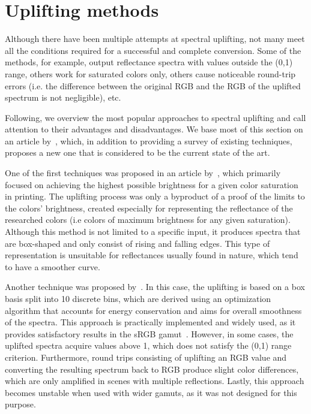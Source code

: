 \section{Uplifting methods} \label{sec:upliftingMethods}

Although there have been multiple attempts at spectral uplifting, not many meet all the conditions required for a successful and complete conversion. Some of the methods, for example, output reflectance spectra with values outside the (0,1) range, others work for saturated colors only, others cause noticeable round-trip errors (i.e. the difference between the original RGB and the RGB of the uplifted spectrum is not negligible), etc.

Following, we overview the most popular approaches to spectral uplifting and call attention to their advantages and disadvantages. We base most of this section on an article by~\citet{upsamplingTechniques}, which, in addition to providing a survey of existing techniques, proposes a new one that is considered to be the current state of the art.

One of the first techniques was proposed in an article by~\citet{upsamplingMacAdam}, which primarily focused on achieving the highest possible brightness for a given color saturation in printing. The uplifting process was only a byproduct of a proof of the limits to the colors' brightness, created especially for representing the reflectance of the researched colors (i.e colors of maximum brightness for any given saturation). Although this method is not limited to a specific input, it produces spectra that are box-shaped and only consist of rising and falling edges. This type of representation is unsuitable for reflectances usually found in nature, which tend to have a smoother curve.

Another technique was proposed by~\citet{upsamplingSmits}. In this case, the uplifting is based on a box basis split into 10 discrete bins, which are derived using an optimization algorithm that accounts for energy conservation and aims for overall smoothness of the spectra. This approach is practically implemented and widely used, as it provides satisfactory results in the sRGB gamut~\cite{upsamplingJakobHanika}. However, in some cases, the uplifted spectra acquire values above 1, which does not satisfy the (0,1) range criterion. Furthermore, round trips consisting of uplifting an RGB value and converting the resulting spectrum back to RGB produce slight color differences, which are only amplified in scenes with multiple reflections. Lastly, this approach becomes unstable when used with wider gamuts, as it was not designed for this purpose.

